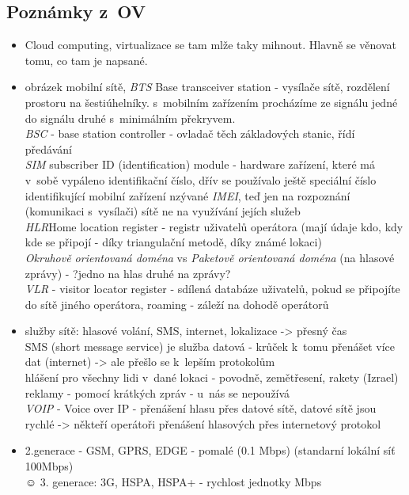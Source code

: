 \documentclass[12pt]{article}
\begin{document}
\subsection{Poznámky z~OV}
\begin{itemize}
\item Cloud computing, virtualizace se tam mlže taky mihnout. Hlavně se věnovat tomu, co tam je napsané.
\item obrázek mobilní sítě, \emph{BTS} Base transceiver station - vysílače sítě, rozdělení prostoru na šestiúhelníky. s~mobilním zařízením procházíme ze signálu jedné do signálu druhé s~minimálním překryvem.\\
\emph{BSC} - base station controller - ovladač těch základových stanic, řídí předávání\\
\emph{SIM} subscriber ID (identification) module - hardware zařízení, které má v~sobě vypáleno identifikační číslo, dřív se používalo ještě speciální číslo identifikující mobilní zařízení nzývané \emph{IMEI}, teď jen na rozpoznání (komunikaci s~vysílači) sítě ne na využívání jejích služeb\\
\emph{HLR}Home location register - registr uživatelů operátora (mají údaje kdo, kdy kde se připojí - díky triangulační metodě, díky známé lokaci)\\
\emph{Okruhově orientovaná doména} vs \emph{Paketově orientovaná doména} (na hlasové zprávy) - ?jedno na hlas druhé na zprávy?\\
\emph{VLR} - visitor locator register - sdílená databáze uživatelů, pokud se připojíte do sítě jiného operátora, roaming - záleží na dohodě operátorů
\item služby sítě: hlasové volání, SMS, internet, lokalizace -> přesný čas\\
SMS (short message service) je služba datová - krůček k~tomu přenášet více dat (internet) -> ale přešlo se k~lepším protokolům\\
hlášení pro všechny lidi v~dané lokaci - povodně, zemětřesení, rakety (Izrael)\\
reklamy - pomocí krátkých zpráv - u~nás se nepoužívá\\
\emph{VOIP} - Voice over IP - přenášení hlasu přes datové sítě, datové sítě jsou rychlé -> někteří operátoři přenášení hlasových přes internetový protokol\\
\item 2.generace - GSM, GPRS, EDGE - pomalé (0.1 Mbps) (standarní lokální síť 100Mbps)\\☺
3. generace: 3G, HSPA, HSPA+ - rychlost jednotky Mbps\\

\end{itemize}
\end{document}
